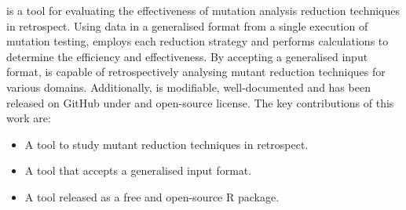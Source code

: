\mr is a tool for evaluating the effectiveness of mutation analysis reduction techniques
in retrospect. Using data in a generalised format from a single execution of mutation testing, \mr
employs each reduction strategy and performs calculations to determine the efficiency and
effectiveness. By accepting a generalised input format, \mr is capable of
retrospectively analysing mutant reduction techniques for various domains.
Additionally, \mr is modifiable, well-documented and has been released on
GitHub under and open-source license. The key contributions of this work are:

    \begin{itemize}
        \item A tool to study mutant reduction techniques in retrospect.
        \item A tool that accepts a generalised input format.
        \item A tool released as a free and open-source R package.
    \end{itemize}
